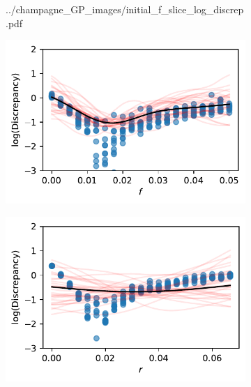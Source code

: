 \begin{figure}[htbp]
\begin{subfigure}[b]{0.5\textwidth}
{            ../champagne_GP_images/initial_f_slice_log_discrep.pdf
        }
    \end{subfigure}%
    \hfill%
    \begin{subfigure}[b]{0.5\textwidth}
        \centering
        \includegraphics[width=\textwidth]{
            ../champagne_GP_images/f_slice_400_bolfi_updates_log_discrep.pdf
        }
    \end{subfigure}
    \hfill%
    \begin{subfigure}[b]{0.5\textwidth}
        \centering
        \includegraphics[width=\textwidth]{
            ../champagne_GP_images/initial_r_slice_log_discrep.pdf
        }
    \end{subfigure}%
    \hfill%
    \begin{subfigure}[b]{0.5\textwidth}
        \centering

\end{subfigure}
\end{figure}
